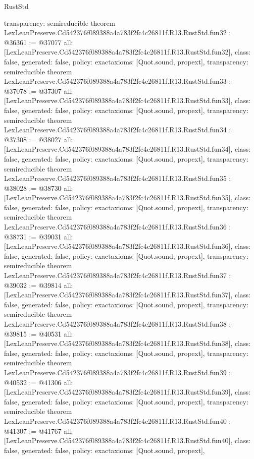 \begin{lexlean}{RustStd}
\begin{coremodule}
{  transparency: semireducible
}
theorem LexLeanPreserve.Cd542376f089388a4a783f2fc4c26811f.R13.RustStd.fun32 : @36361 := @37077 {
  all: [LexLeanPreserve.Cd542376f089388a4a783f2fc4c26811f.R13.RustStd.fun32],
  class: false,
  generated: false,
  policy: exact{axioms: [Quot.sound, propext]},
  transparency: semireducible
}
theorem LexLeanPreserve.Cd542376f089388a4a783f2fc4c26811f.R13.RustStd.fun33 : @37078 := @37307 {
  all: [LexLeanPreserve.Cd542376f089388a4a783f2fc4c26811f.R13.RustStd.fun33],
  class: false,
  generated: false,
  policy: exact{axioms: [Quot.sound, propext]},
  transparency: semireducible
}
theorem LexLeanPreserve.Cd542376f089388a4a783f2fc4c26811f.R13.RustStd.fun34 : @37308 := @38027 {
  all: [LexLeanPreserve.Cd542376f089388a4a783f2fc4c26811f.R13.RustStd.fun34],
  class: false,
  generated: false,
  policy: exact{axioms: [Quot.sound, propext]},
  transparency: semireducible
}
theorem LexLeanPreserve.Cd542376f089388a4a783f2fc4c26811f.R13.RustStd.fun35 : @38028 := @38730 {
  all: [LexLeanPreserve.Cd542376f089388a4a783f2fc4c26811f.R13.RustStd.fun35],
  class: false,
  generated: false,
  policy: exact{axioms: [Quot.sound, propext]},
  transparency: semireducible
}
theorem LexLeanPreserve.Cd542376f089388a4a783f2fc4c26811f.R13.RustStd.fun36 : @38731 := @39031 {
  all: [LexLeanPreserve.Cd542376f089388a4a783f2fc4c26811f.R13.RustStd.fun36],
  class: false,
  generated: false,
  policy: exact{axioms: [Quot.sound, propext]},
  transparency: semireducible
}
theorem LexLeanPreserve.Cd542376f089388a4a783f2fc4c26811f.R13.RustStd.fun37 : @39032 := @39814 {
  all: [LexLeanPreserve.Cd542376f089388a4a783f2fc4c26811f.R13.RustStd.fun37],
  class: false,
  generated: false,
  policy: exact{axioms: [Quot.sound, propext]},
  transparency: semireducible
}
theorem LexLeanPreserve.Cd542376f089388a4a783f2fc4c26811f.R13.RustStd.fun38 : @39815 := @40531 {
  all: [LexLeanPreserve.Cd542376f089388a4a783f2fc4c26811f.R13.RustStd.fun38],
  class: false,
  generated: false,
  policy: exact{axioms: [Quot.sound, propext]},
  transparency: semireducible
}
theorem LexLeanPreserve.Cd542376f089388a4a783f2fc4c26811f.R13.RustStd.fun39 : @40532 := @41306 {
  all: [LexLeanPreserve.Cd542376f089388a4a783f2fc4c26811f.R13.RustStd.fun39],
  class: false,
  generated: false,
  policy: exact{axioms: [Quot.sound, propext]},
  transparency: semireducible
}
theorem LexLeanPreserve.Cd542376f089388a4a783f2fc4c26811f.R13.RustStd.fun40 : @41307 := @41767 {
  all: [LexLeanPreserve.Cd542376f089388a4a783f2fc4c26811f.R13.RustStd.fun40],
  class: false,
  generated: false,
  policy: exact{axioms: [Quot.sound, propext]},
}
\end{coremodule}
\end{lexlean}
